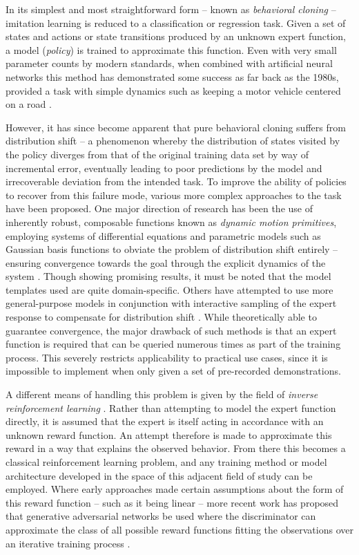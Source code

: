 \documentclass{article}
\begin{document}
In its simplest and most straightforward form -- known as \emph{behavioral cloning} -- imitation learning is reduced to a classification or regression task. Given a set of states and actions or state transitions produced by an unknown expert function, a model (\emph{policy}) is trained to approximate this function. Even with very small parameter counts by modern standards, when combined with artificial neural networks this method has demonstrated some success as far back as the 1980s, provided a task with simple dynamics such as keeping a motor vehicle centered on a road \citep{pomerleau1989alvinn}.

However, it has since become apparent that pure behavioral cloning suffers from distribution shift -- a phenomenon whereby the distribution of states visited by the policy diverges from that of the original training data set by way of incremental error, eventually leading to poor predictions by the model and irrecoverable deviation from the intended task. To improve the ability of policies to recover from this failure mode, various more complex approaches to the task have been proposed. One major direction of research has been the use of inherently robust, composable functions known as \emph{dynamic motion primitives}, employing systems of differential equations and parametric models such as Gaussian basis functions to obviate the problem of distribution shift entirely -- ensuring convergence towards the goal through the explicit dynamics of the system \citep{pastor2009learning}. Though showing promising results, it must be noted that the model templates used are quite domain-specific. Others have attempted to use more general-purpose models in conjunction with interactive sampling of the expert response to compensate for distribution shift \citep{ross2011no}. While theoretically able to guarantee convergence, the major drawback of such methods is that an expert function is required that can be queried numerous times as part of the training process. This severely restricts applicability to practical use cases, since it is impossible to implement when only given a set of pre-recorded demonstrations.

A different means of handling this problem is given by the field of \emph{inverse reinforcement learning} \citep{abbeel2004apprenticeship}. Rather than attempting to model the expert function directly, it is assumed that the expert is itself acting in accordance with an unknown reward function. An attempt therefore is made to approximate this reward in a way that explains the observed behavior. From there this becomes a classical reinforcement learning problem, and any training method or model architecture developed in the space of this adjacent field of study can be employed. Where early approaches made certain assumptions about the form of this reward function -- such as it being linear -- more recent work has proposed that generative adversarial networks be used where the discriminator can approximate the class of all possible reward functions fitting the observations over an iterative training process \citep{ho2016generative,torabi2018generative}.
\end{document}
